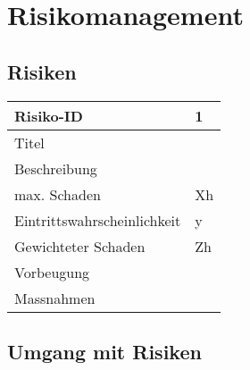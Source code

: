 \chapter{Risikomanagement}
	\label{risiken} 
	\section{Risiken}

		\noindent
		\begin{tabular}{|p{} | p{} |}
			\hline	
			Risiko-ID & 1  \\
			\hline
			Titel &  \\
			Beschreibung &  \\
			max. Schaden	& Xh  \\
			Eintrittswahrscheinlichkeit & y  \\
			Gewichteter Schaden	& Zh  \\
			Vorbeugung	&  \\
			Massnahmen	&  \\
			\hline
		\end{tabular}
		\hspace{0.5cm}
		\newline


	\section{Umgang mit Risiken}
